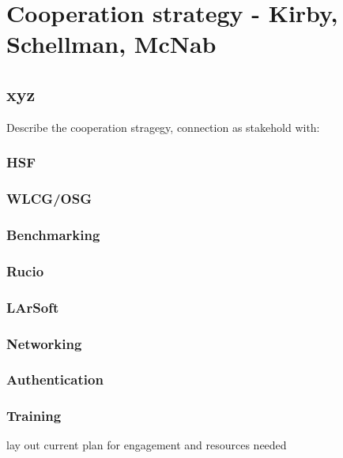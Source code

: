 \chapter{Cooperation strategy - Kirby, Schellman, McNab}
\label{ch:coop}

\section{xyz}
\label{sec:coop:xyz}  %

Describe the cooperation stragegy, connection as stakehold with:

\subsection{HSF}
\subsection{WLCG/OSG}
\subsection{Benchmarking}
\subsection{Rucio}
\subsection{LArSoft}
\subsection{Networking}
\subsection{Authentication}
\subsection{Training}

lay out current plan for engagement and resources needed

